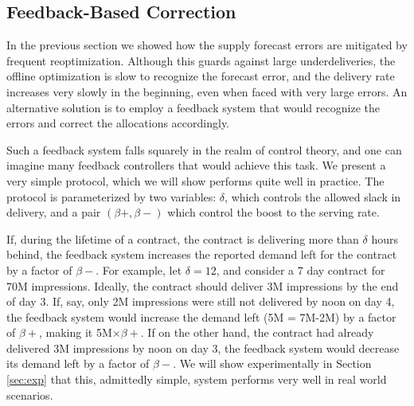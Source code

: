 \subsection{Feedback-Based Correction}
\label{sec:feedback}
In the previous section we showed how the supply forecast errors are mitigated by frequent reoptimization.
Although this guards against large underdeliveries, the offline optimization is slow to recognize the forecast error,
and the delivery rate increases very slowly in the beginning, even when faced with very large errors. An alternative solution is to
employ a feedback system that would recognize the errors and correct the allocations accordingly.

Such a feedback system falls squarely in the realm of control theory, and one can imagine many feedback controllers that would achieve this task.
We present a very simple protocol, which we will show performs quite well in practice.  The protocol is parameterized by two variables: $\delta$, which
controls the allowed slack in delivery, and a pair $(\beta+, \beta-)$ which control the boost to the serving rate.

If, during the lifetime of a contract,  the contract is delivering
more than $\delta$ hours behind, the feedback system increases the
reported demand left for the contract by a factor of $\beta-$. For
example, let $\delta = 12$, and consider a 7 day contract for 70M
impressions. Ideally, the contract should deliver 3M impressions by
the end of day 3. If, say, only 2M impressions were still not
delivered by noon on day 4, the feedback system would increase the
demand left (5M = 7M-2M) by a factor of $\beta+$, making it
5M$\times\beta+$.
 If on the other hand, the contract had already delivered 3M impressions by noon on day 3, the feedback system would decrease
 its demand left by a factor of $\beta-$. We will show experimentally in Section \ref{sec:exp} that this, admittedly simple,
 system performs very well in real world scenarios.
